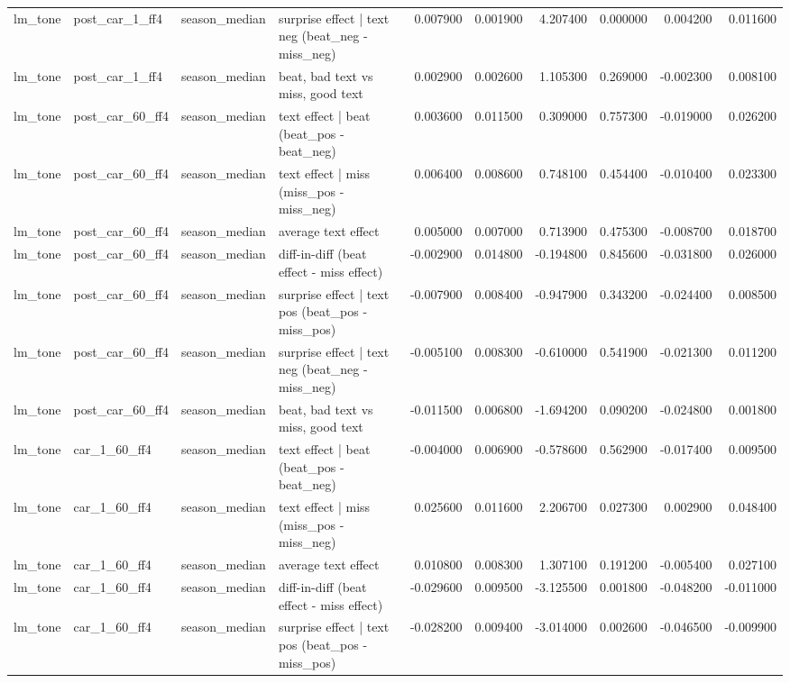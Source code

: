 \begin{table}
\begin{tabular}{llllrrrrrr}
lm\_tone & post\_car\_1\_ff4 & season\_median & surprise effect | text neg (beat\_neg - miss\_neg) & 0.007900 & 0.001900 & 4.207400 & 0.000000 & 0.004200 & 0.011600 \\
lm\_tone & post\_car\_1\_ff4 & season\_median & beat, bad text vs miss, good text & 0.002900 & 0.002600 & 1.105300 & 0.269000 & -0.002300 & 0.008100 \\
lm\_tone & post\_car\_60\_ff4 & season\_median & text effect | beat  (beat\_pos - beat\_neg) & 0.003600 & 0.011500 & 0.309000 & 0.757300 & -0.019000 & 0.026200 \\
lm\_tone & post\_car\_60\_ff4 & season\_median & text effect | miss  (miss\_pos - miss\_neg) & 0.006400 & 0.008600 & 0.748100 & 0.454400 & -0.010400 & 0.023300 \\
lm\_tone & post\_car\_60\_ff4 & season\_median & average text effect & 0.005000 & 0.007000 & 0.713900 & 0.475300 & -0.008700 & 0.018700 \\
lm\_tone & post\_car\_60\_ff4 & season\_median & diff-in-diff (beat effect - miss effect) & -0.002900 & 0.014800 & -0.194800 & 0.845600 & -0.031800 & 0.026000 \\
lm\_tone & post\_car\_60\_ff4 & season\_median & surprise effect | text pos (beat\_pos - miss\_pos) & -0.007900 & 0.008400 & -0.947900 & 0.343200 & -0.024400 & 0.008500 \\
lm\_tone & post\_car\_60\_ff4 & season\_median & surprise effect | text neg (beat\_neg - miss\_neg) & -0.005100 & 0.008300 & -0.610000 & 0.541900 & -0.021300 & 0.011200 \\
lm\_tone & post\_car\_60\_ff4 & season\_median & beat, bad text vs miss, good text & -0.011500 & 0.006800 & -1.694200 & 0.090200 & -0.024800 & 0.001800 \\
lm\_tone & car\_1\_60\_ff4 & season\_median & text effect | beat  (beat\_pos - beat\_neg) & -0.004000 & 0.006900 & -0.578600 & 0.562900 & -0.017400 & 0.009500 \\
lm\_tone & car\_1\_60\_ff4 & season\_median & text effect | miss  (miss\_pos - miss\_neg) & 0.025600 & 0.011600 & 2.206700 & 0.027300 & 0.002900 & 0.048400 \\
lm\_tone & car\_1\_60\_ff4 & season\_median & average text effect & 0.010800 & 0.008300 & 1.307100 & 0.191200 & -0.005400 & 0.027100 \\
lm\_tone & car\_1\_60\_ff4 & season\_median & diff-in-diff (beat effect - miss effect) & -0.029600 & 0.009500 & -3.125500 & 0.001800 & -0.048200 & -0.011000 \\
lm\_tone & car\_1\_60\_ff4 & season\_median & surprise effect | text pos (beat\_pos - miss\_pos) & -0.028200 & 0.009400 & -3.014000 & 0.002600 & -0.046500 & -0.009900 \\

\end{tabular}
\end{table}
